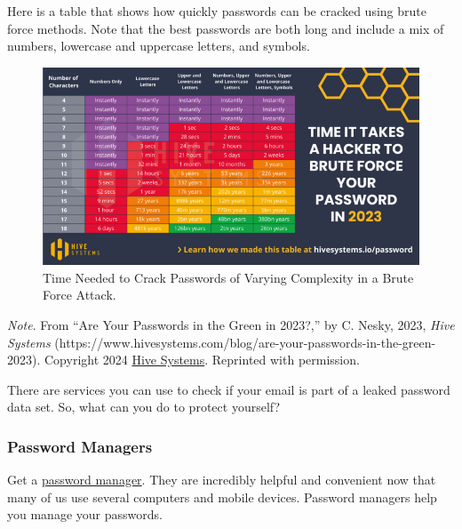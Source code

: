\documentclass[
  letterpaper,
  DIV=11,
  numbers=noendperiod]{scrreprt}
\begin{document}
Here is a table that shows how quickly passwords can be cracked using
brute force methods. Note that the best passwords are both long and
include a mix of numbers, lowercase and uppercase letters, and symbols.

\begin{figure}

\caption{\label{fig-brute}Time Needed to Crack Passwords of Varying
Complexity in a Brute Force Attack.}

\includegraphics{assets/u1/brute.jpg}

\end{figure}%

\begin{tcolorbox}[enhanced jigsaw, toprule=.15mm, colback=white, colframe=quarto-callout-note-color-frame, arc=.35mm, opacityback=0, breakable, rightrule=.15mm, bottomrule=.15mm, leftrule=.75mm, left=2mm]

\emph{Note}. From ``Are Your Passwords in the Green in 2023?,'' by C.
Nesky, 2023, \emph{Hive Systems}
(https://www.hivesystems.com/blog/are-your-passwords-in-the-green-2023).
Copyright 2024 \href{https://www.hivesystems.com/}{Hive Systems}.
Reprinted with permission.

\end{tcolorbox}

There are services you can use to check if your email is part of a
leaked password data set. So, what can you do to protect yourself?

\subsubsection*{Password Managers}\label{password-managers}

Get a \href{https://en.wikipedia.org/wiki/Password_manager}{password
manager}. They are incredibly helpful and convenient now that many of us
use several computers and mobile devices. Password managers help you
manage your passwords.
\end{document}

